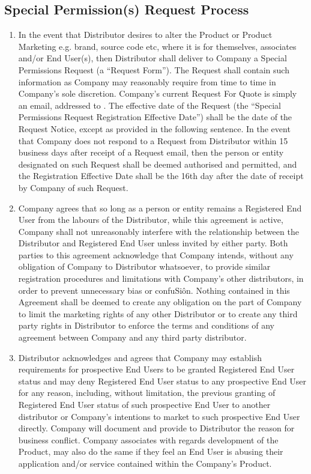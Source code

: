 \documentclass[letterpaper,10pt,english]{sphinxmanual}
\begin{document}
\subsection{Special Permission(s) Request Process}
\label{\detokenize{grantlicence:special-permission-s-request-process}}\begin{enumerate}
\item {} 
In the event that Distributor desires to alter the Product or Product Marketing e.g. brand, source code etc, where it is for themselves, associates and/or End User(s), then Distributor shall deliver to Company a Special Permissions Request (a “Request Form”). The Request shall contain such information as Company may reasonably require from time to time in Company’s sole discretion. Company’s current Request For Quote is simply an email, addressed to  .  The effective date of the Request  (the “Special Permissions Request Registration Effective Date”) shall be the date of the Request Notice, except as provided in the following sentence. In the event that Company does not respond to a Request from Distributor within 15 business days after receipt of a Request email, then the person or entity designated on such Request shall be deemed authorised and permitted, and the Registration Effective Date  shall be the 16th day after the date of receipt by Company of such Request.

\item {} 
Company agrees that so long as a person or entity remains a Registered End User from the  labours of the Distributor, while this agreement is active, Company shall not unreasonably interfere with the relationship between the Distributor and Registered End User unless invited by either party. Both parties to this agreement acknowledge that Company intends, without any obligation of Company to Distributor whatsoever, to provide similar registration procedures and limitations with Company’s other distributors, in order to prevent unnecessary bias or confuSiôn. Nothing contained in this Agreement shall be deemed to create any obligation on the part of Company to limit the marketing rights of any other Distributor or to create any third party rights in Distributor to enforce the terms and conditions of any agreement between Company and any third party distributor.

\item {} 
Distributor acknowledges and agrees that Company may establish requirements for prospective End Users to be granted Registered End User status and may deny Registered End User status to any prospective End User for any reason, including, without limitation, the previous granting of Registered End User status of such prospective End User to another distributor or Company’s intentions to market to such prospective End User directly. Company will document and provide to Distributor the reason for business conflict. Company associates with regards development of the Product, may also do the same if they feel an End User is abusing their application and/or service contained within the Company’s Product.

\end{enumerate}
\end{document}
